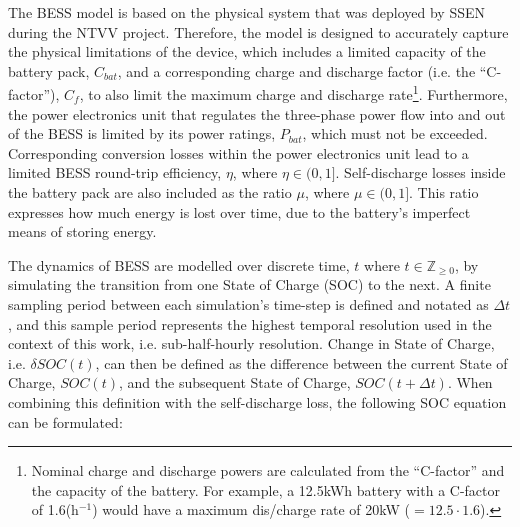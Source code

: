 \nomenclature[J]{$\mu$}{Self-discharge losses of battery, where $\mu \in (0, 1]$}
\nomenclature[J]{$\eta$}{Round-trip efficiency of power electronics, where $\eta \in (0, 1]$}

The BESS model is based on the physical system that was deployed by SSEN during the NTVV project.
Therefore, the model is designed to accurately capture the physical limitations of the device, which includes a limited capacity of the battery pack, $C_{bat}$, and a corresponding charge and discharge factor (i.e. the ``C-factor''), $C_{f}$, to also limit the maximum charge and discharge rate\footnote{Nominal charge and discharge powers are calculated from the ``C-factor'' and the capacity of the battery. For example, a 12.5kWh battery with a C-factor of 1.6(h$^{-1}$) would have a maximum dis/charge rate of 20kW ($=12.5 \cdot 1.6$).}.
Furthermore, the power electronics unit that regulates the three-phase power flow into and out of the BESS is limited by its power ratings, $P_{bat}$, which must not be exceeded.
Corresponding conversion losses within the power electronics unit lead to a limited BESS round-trip efficiency, $\eta$, where $\eta \in (0, 1]$.
Self-discharge losses inside the battery pack are also included as the ratio $\mu$, where $\mu \in (0, 1]$.
This ratio expresses how much energy is lost over time, due to the battery's imperfect means of storing energy.

The dynamics of BESS are modelled over discrete time, $t$ where $t \in \mathbb{Z}_{\geq0}$, by simulating the transition from one State of Charge (SOC) to the next.
A finite sampling period between each simulation's time-step is defined and notated as $\Delta t$, and this sample period represents the highest temporal resolution used in the context of this work, i.e. sub-half-hourly resolution.
Change in State of Charge, i.e. $\delta SOC(t)$, can then be defined as the difference between the current State of Charge, $SOC(t)$, and the subsequent State of Charge, $SOC(t+\Delta t)$.
When combining this definition with the self-discharge loss, the following SOC equation can be formulated:


